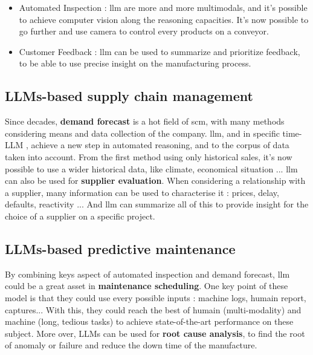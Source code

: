 \begin{itemize}
    \item Automated Inspection : \acrshort{llm} are more and more multimodals, and it's possible to achieve computer vision along the reasoning capacities. It's now possible to go further and use camera to control every products on a conveyor. 
    \item Customer Feedback : \acrshort{llm} can be used to summarize and prioritize feedback, to be able to use precise insight on the manufacturing process.
\end{itemize}

\subsection{LLMs-based supply chain management}
\label{sec:llm_scm}
Since decades, \textbf{demand forecast} is a hot field of \acrfull{scm}, with many methods considering means and data collection of the company. \acrshort{llm}, and in specific time-LLM \cite{jin_time-llm_2024}, achieve a new step in automated reasoning, and to the corpus of data taken into account. From the first method using only historical sales, it's now possible to use a wider historical data, like climate, economical situation ... \acrshort{llm} can also be used for \textbf{supplier evaluation}. When considering a relationship with a supplier, many information can be used to characterise it : prices, delay, defaults, reactivity ... And \acrshort{llm} can summarize all of this to provide insight for the choice of a supplier on a specific project.   


\subsection{LLMs-based predictive maintenance}
\label{sec:llm_pred_maint}
By combining keys aspect of automated inspection and demand forecast, \acrshort{llm} could be a great asset in \textbf{maintenance scheduling}. One key point of these model is that they could use every possible inputs : machine logs, humain report, captures... With this, they could reach the best of humain (multi-modality) and machine (long, tedious tasks) to achieve state-of-the-art performance on these subject. More over, LLMs can be used for \textbf{root cause analysis}, to find the root of anomaly or failure and reduce the down time of the manufacture. 

